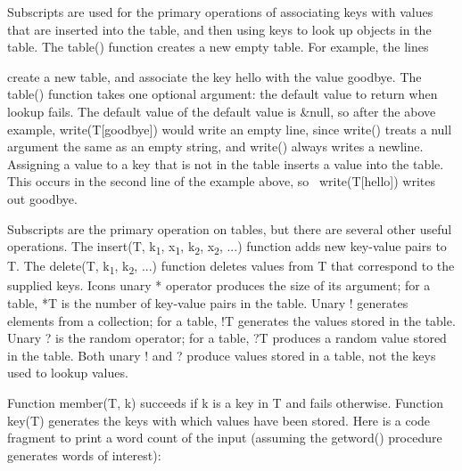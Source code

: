 Subscripts are used for the primary operations of
associating keys with values that are inserted into the table, and then
using keys to look up objects in the table. The \textsf{table()}
function creates a new empty table. For example, the lines


\noindent
create a new table, and associate the key
\textsf{{\textquotedbl}hello{\textquotedbl}} with the value
\textsf{{\textquotedbl}goodbye{\textquotedbl}}. The \textsf{table()}
function takes one optional argument: the default value to return when lookup fails. The default value of the default value is
\textsf{\&null}, so after the above example,
\textsf{write(T[{\textquotedbl}goodbye{\textquotedbl}])} would write an
empty line, since \textsf{write()} treats a null argument the same as
an empty string, and \textsf{write()} always writes a newline.
Assigning a value to a key that is not in the table inserts a value
into the table. This occurs in the second line of the example above, so
\ \textsf{write(T[{\textquotedbl}hello{\textquotedbl}])} writes out
\textsf{{\textquotedbl}goodbye{\textquotedbl}}.

Subscripts are the primary operation on tables, but there are several
other useful operations. The \textsf{insert(T,
k}\textsf{\textsubscript{1}}\textsf{,
x}\textsf{\textsubscript{1}}\textsf{,
k}\textsf{\textsubscript{2}}\textsf{,
x}\textsf{\textsubscript{2}}\textsf{, ...)} function adds new key-value
pairs to \textsf{T}. The \textsf{delete(T,
k}\textsf{\textsubscript{1}}\textsf{,
k}\textsf{\textsubscript{2}}\textsf{, ...)} function deletes values
from \textsf{T} that correspond to the supplied keys.
Icon{\textquotesingle}s unary \textsf{*} operator produces the size of
its argument; for a table, \textsf{*T} is the
number of key-value pairs in the table. Unary \textsf{!} generates
elements from a collection; for a table, \textsf{!T} generates the
values stored in the table. Unary \textsf{?} is the random operator;
for a table, \textsf{?T} produces a random value stored in the table.
Both unary \textsf{!} and \textsf{?} produce values stored in a table,
not the keys used to lookup values.

Function \textsf{member(T, k)} succeeds if
\textsf{k} is a key in \textsf{T} and fails otherwise. Function
\textsf{key(T)} generates the keys with which values
have been stored. Here is a code fragment to print a word count of the
input (assuming the \textsf{getword()} procedure generates words of
interest): 


